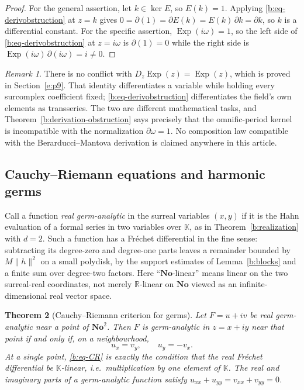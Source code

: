 \documentclass[11pt,a4paper]{article}
\numberwithin{equation}{section}
\newtheorem{theorem}{Theorem}[section]
\theoremstyle{definition}
\theoremstyle{remark}
\newtheorem{remark}[theorem]{Remark}
\theoremstyle{plain}
\newcommand{\K}{\mathbb K}
\newcommand{\No}{\mathbf{No}}
\newcommand{\RR}{\mathbb R}
\DeclareMathOperator{\Exp}{Exp}
\newcommand{\norm}[1]{\lVert #1\rVert}
\begin{document}
\begin{proof}
For the general assertion, let $k\in\ker E$, so $E(k)=1$. Applying
\eqref{b:eq-derivobstruction} at $z=k$ gives
$0=\partial(1)=\partial E(k)=E(k)\,\partial k=\partial k$, so $k$ is a
differential constant. For the specific assertion, $\Exp(i\omega)=1$, so
the left side of \eqref{b:eq-derivobstruction} at $z=i\omega$ is
$\partial(1)=0$ while the right side is
$\Exp(i\omega)\,\partial(i\omega)=i\ne0$.
\end{proof}

\begin{remark}
\label{b:no-conflict-Dz}
There is no conflict with $D_z\Exp(z)=\Exp(z)$, which is proved in Section~\ref{e:p9}. That identity differentiates a variable while holding every
surcomplex coefficient fixed; \eqref{b:eq-derivobstruction} differentiates
the field's own elements as transseries. The two are different
mathematical tasks, and Theorem~\ref{b:derivation-obstruction} says
precisely that the omnific-period kernel is incompatible with the
normalization $\partial\omega=1$. No composition law compatible with the
Berarducci--Mantova derivation is claimed anywhere in this article.
\end{remark}

\subsection{Cauchy--Riemann equations and harmonic germs}

Call a function \emph{real germ-analytic} in the surreal variables
$(x,y)$ if it is the Hahn evaluation of a formal series in two variables
over $\K$, as in Theorem~\ref{b:realization} with $d=2$. Such a function
has a Fr\'echet differential in the fine sense: subtracting its
degree-zero and degree-one parts leaves a remainder bounded by
$M\norm h^{2}$ on a small polydisk, by the support estimates of
Lemma~\ref{b:blocks} and a finite sum over degree-two factors. Here
``$\No$-linear'' means linear on the two surreal-real coordinates, not
merely $\RR$-linear on $\No$ viewed as an infinite-dimensional real vector
space.

\begin{theorem}[Cauchy--Riemann criterion for germs]
\label{b:CRgerm}
Let $F=u+iv$ be real germ-analytic near a point of $\No^{2}$. Then $F$ is
germ-analytic in $z=x+iy$ near that point if and only if, on a
neighbourhood,
\begin{equation}
\label{b:eq-CR}
 u_x=v_y,\qquad u_y=-v_x .
\end{equation}
At a single point, \eqref{b:eq-CR} is exactly the condition that the real
Fr\'echet differential be $\K$-linear, i.e.\ multiplication by one element
of $\K$. The real and imaginary parts of a germ-analytic function satisfy
$u_{xx}+u_{yy}=v_{xx}+v_{yy}=0$.
\end{theorem}
\end{document}
